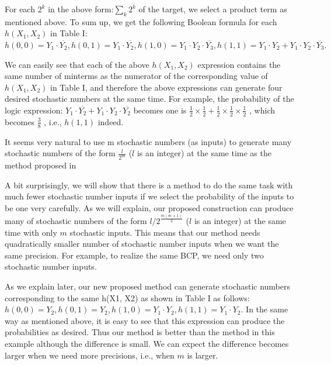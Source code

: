 \documentclass[10pt,conference]{IEEEtran}
\begin{document}
\par
For each $2^k$ in the above form:$\sum_{k} 2^{k}$ of the target, we
select a product term as mentioned above. To sum up, we get
the following Boolean formula for each $h(X_1, X_2)$ in Table I:
$h(0, 0) = Y_1 \cdot \overline{Y_2}, h(0, 1) = Y_1 \cdot \overline{Y_2}, h(1, 0) = Y_1 \cdot Y_2 \cdot \overline{Y_3}, h(1, 1) = Y_1 \cdot Y_2 + Y_1 \cdot Y_2 \cdot \overline{Y_3}.$

\par
We can easily see that each of the above $h(X_1, X_2)$ expression
contains the same number of minterms as the numerator
of the corresponding value of $h(X_1, X_2)$ in Table I, and therefore
the above expressions can generate four desired stochastic
numbers at the same time. For example, the probability of the
logic expression: $Y_1 \cdot \overline{Y_2} + Y_1 \cdot Y_2 \cdot \overline{Y_2}$ becomes one is 
$\frac{1}{2} \times \frac{1}{2} + \frac{1}{2} \times \frac{1}{2} \times \frac{1}{2}$
, which becomes $\frac{3}{8}$ , i.e., $h(1, 1)$ indeed.

\par
It seems very natural to use m stochastic numbers (as
inputs) to generate many stochastic numbers of the form $\frac{l}{2^m}$ ($l$
is an integer) at the same time as the method proposed in  \cite{b15}

\par
A bit surprisingly, we will show that there is a method to do
the same task with much fewer stochastic number inputs if we
select the probability of the inputs to be one very carefully. As
we will explain, our proposed construction can produce many
of stochastic numbers of the form $l/2^{\frac{m(m+1)}{2}}$ ($l$ is an integer) at
the same time with only $m$ stochastic inputs. This means that our method needs quadratically smaller number of stochastic number inputs when we want the same precision. For example,
to realize the same BCP, we need only two stochastic number inputs.

\par
As we explain later, our new proposed method can generate
stochastic numbers corresponding to the same h(X1, X2) as
shown in Table I as follows: $h(0, 0) = Y_2, h(0, 1) = Y_2,
h(1, 0) = Y_1 \cdot Y_2, h(1, 1) = Y_1 \cdot Y_2$. In the same way as
mentioned above, it is easy to see that this expression can
produce the probabilities as desired. Thus our method is better
than the method \cite{fifteen} in this example although the difference
is small. We can expect the difference becomes larger when
we need more precisions, i.e., when $m$ is larger.
\end{document}
